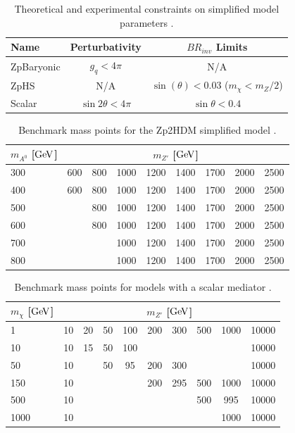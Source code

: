 \begin{table}[htbH]
\begin{center}
\begin{tabular}{ l | c | c}
\hline
Name & Perturbativity & $BR_{inv}$ Limits \\
\hline
ZpBaryonic & $g_q<4\pi$ & N/A\\
ZpHS & N/A & $\sin(\theta) < 0.03$ ($m_\chi < m_Z/2$) \\
Scalar & $\sin2\theta<4\pi$ & $\sin\theta<0.4$ \\
\hline
\end{tabular}
\caption{Theoretical and experimental constraints on simplified model parameters \cite{Carpenter:2013xra, Abercrombie:2015wmb}.}\label{tab:smlims}
\end{center}
\end{table}

\begin{table}[htbH] 
\begin{center} 
\begin{tabular}{ l | c | c | c | c | c | c | c | c} 
\hline 
$m_{A^0}$ [$\mathrm{Ge\kern -0.1em V}$] & \multicolumn{8}{|c}{$m_{Z'}$ [$\mathrm{Ge\kern -0.1em V}$]} \\ 
\hline 
300 & 600 & 800 & 1000 & 1200 & 1400 & 1700 & 2000 & 2500 \\ 
400 & 600 & 800 & 1000 & 1200 & 1400 & 1700 & 2000 & 2500 \\ 
500 & & 800 & 1000 & 1200 & 1400 & 1700 & 2000 & 2500 \\ 
600 & & 800 & 1000 & 1200 & 1400 & 1700 & 2000 & 2500 \\
700 & & & 1000 & 1200 & 1400 & 1700 & 2000 & 2500 \\ 
800 & & & 1000 & 1200 & 1400 & 1700 & 2000 & 2500 \\ 
\hline
\end{tabular} 
\caption{Benchmark mass points for the Zp2HDM simplified model \cite{Abercrombie:2015wmb}.}\label{tab:MM2HDM} 
\end{center} 
\end{table} 

\begin{table}[htbH] 
\begin{center} 
\begin{tabular}{ l | c | c | c | c | c | c | c | c | c} 
\hline 
$m_\chi$ [$\mathrm{Ge\kern -0.1em V}$] & \multicolumn{9}{c}{$m_{Z'}$ [$\mathrm{Ge\kern -0.1em V}$]} \\ 
\hline 
1 & 10 & 20 & 50 & 100 & 200 & 300 & 500 & 1000 & 10000 \\
10 & 10 & 15 & 50 & 100 & & & & & 10000 \\
50 & 10 & & 50 & 95  & 200 & 300 & & & 10000 \\
150 & 10 & & & & 200 & 295 & 500 & 1000 & 10000 \\
500 & 10 & & & & & & 500 & 995 & 10000 \\
1000 & 10 & & & & & & & 1000 & 10000 \\
\hline
\end{tabular} 
\caption{Benchmark mass points for models with a scalar mediator \cite{Abercrombie:2015wmb}.}\label{tab:MMScalar} 
\end{center} 
\end{table} 

